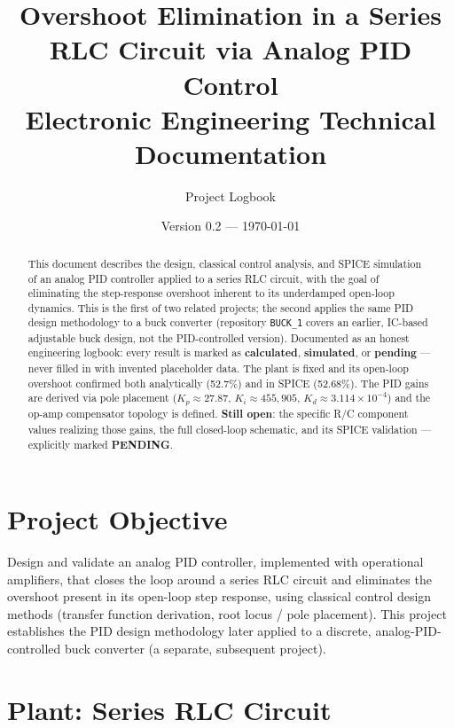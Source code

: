 \documentclass[11pt,letterpaper]{article}
\title{\textbf{Overshoot Elimination in a Series RLC Circuit via Analog PID Control} \\[4pt]
\large Electronic Engineering Technical Documentation}
\author{Project Logbook}
\date{Version 0.2 --- \today}
\begin{document}
\maketitle

\begin{abstract}
\noindent This document describes the design, classical control analysis, and SPICE simulation of an
analog PID controller applied to a series RLC circuit, with the goal of eliminating the step-response
overshoot inherent to its underdamped open-loop dynamics. This is the first of two related projects; the
second applies the same PID design methodology to a buck converter (repository \texttt{BUCK\_1} covers an
earlier, IC-based adjustable buck design, not the PID-controlled version). Documented as an honest
engineering logbook: every result is marked as \textbf{calculated}, \textbf{simulated}, or
\textbf{pending} --- never filled in with invented placeholder data. The plant is fixed and its open-loop
overshoot confirmed both analytically (52.7\%) and in SPICE (52.68\%). The PID gains are derived via
pole placement ($K_p\approx27.87$, $K_i\approx455{,}905$, $K_d\approx3.114\times10^{-4}$) and the op-amp
compensator topology is defined. \textbf{Still open}: the specific R/C component values realizing those
gains, the full closed-loop schematic, and its SPICE validation --- explicitly marked \textbf{PENDING}.
\end{abstract}

\tableofcontents
\newpage

\section{Project Objective}

Design and validate an analog PID controller, implemented with operational amplifiers, that closes the
loop around a series RLC circuit and eliminates the overshoot present in its open-loop step response,
using classical control design methods (transfer function derivation, root locus / pole placement).
This project establishes the PID design methodology later applied to a discrete, analog-PID-controlled
buck converter (a separate, subsequent project).

\section{Plant: Series RLC Circuit}
\end{document}
